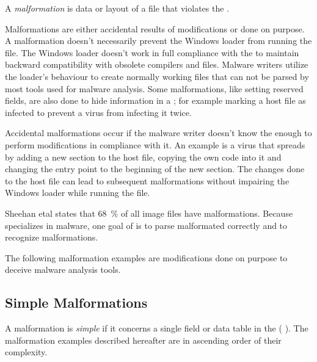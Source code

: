 \begin{definition}[Malformation]
A \emph{malformation} is data or layout of a \PE{} file that violates the \PECOFF{}.
\end{definition} 

Malformations are either accidental results of \PE{} modifications or done on purpose.
A malformation doesn't necessarily prevent the Windows loader from running the file. The Windows loader doesn't work in full compliance with the \PECOFF{} to maintain backward compatibility with obsolete compilers and files. Malware writers utilize the loader's behaviour to create normally working \PE{} files that can not be parsed by most tools used for malware analysis. Some malformations, like setting reserved fields, are also done to hide information in a \PE{}; for example marking a host file as infected to prevent a virus from infecting it twice.

Accidental malformations occur if the malware writer doesn't know the \PECOFF{} enough to perform modifications in compliance with it. An example is a virus that spreads by adding a new section to the host file, copying the own code into it and changing the entry point to the beginning of the new section. The changes done to the host file can lead to subsequent malformations without impairing the Windows loader while running the file.

Sheehan et\thinspace{}al states that 68~\% of all image files have malformations. \cite[slide 7]{sheehan07}
Because \portex{} specializes in \PE{} malware, one goal of \portex{} is to parse malformated  correctly and to recognize malformations.


The following malformation examples are modifications done on purpose to deceive malware analysis tools.

\subsection{Simple Malformations}

A malformation is \emph{simple} if it concerns a single field or data table in the \PE{} (\cf{} \cite[slide 7]{vuksan11}).
The malformation examples described hereafter are in ascending order of their complexity. 

